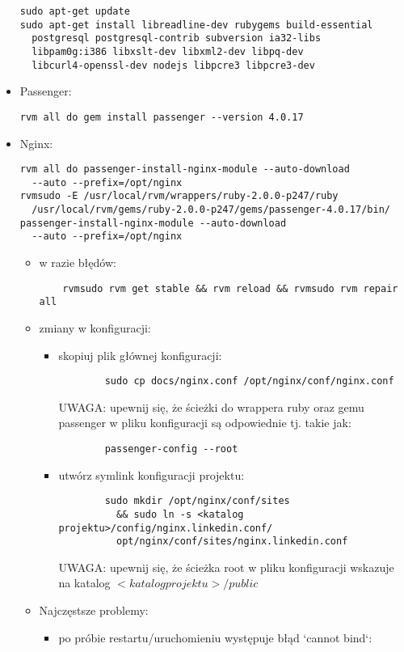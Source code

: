 \begin{itemize}
\begin{verbatim}
sudo apt-get update
sudo apt-get install libreadline-dev rubygems build-essential
  postgresql postgresql-contrib subversion ia32-libs
  libpam0g:i386 libxslt-dev libxml2-dev libpq-dev
  libcurl4-openssl-dev nodejs libpcre3 libpcre3-dev
\end{verbatim}
\item Passenger:
\begin{verbatim}
rvm all do gem install passenger --version 4.0.17
\end{verbatim}
\item Nginx:
\begin{verbatim}
rvm all do passenger-install-nginx-module --auto-download
  --auto --prefix=/opt/nginx
rvmsudo -E /usr/local/rvm/wrappers/ruby-2.0.0-p247/ruby
  /usr/local/rvm/gems/ruby-2.0.0-p247/gems/passenger-4.0.17/bin/
passenger-install-nginx-module --auto-download
  --auto --prefix=/opt/nginx
\end{verbatim}
	\begin{itemize}
	\item w razie błędów:
	\begin{verbatim}
	rvmsudo rvm get stable && rvm reload && rvmsudo rvm repair all
	\end{verbatim}
	\item zmiany w konfiguracji:
		\begin{itemize}
		\item skopiuj plik głównej konfiguracji:
		\begin{verbatim}
		sudo cp docs/nginx.conf /opt/nginx/conf/nginx.conf
		\end{verbatim}
		UWAGA: upewnij się, że ścieżki do wrappera ruby oraz gemu passenger w pliku konfiguracji są odpowiednie tj. takie jak:
		\begin{verbatim}
		passenger-config --root
		\end{verbatim}
				\item utwórz symlink konfiguracji projektu:
		\begin{verbatim}
		sudo mkdir /opt/nginx/conf/sites
		  && sudo ln -s <katalog projektu>/config/nginx.linkedin.conf/
		  opt/nginx/conf/sites/nginx.linkedin.conf
		\end{verbatim}
		UWAGA: upewnij się, że ścieżka root w pliku konfiguracji wskazuje na katalog $<katalog projektu>/public$
		\end{itemize}
	\item Najczęstsze problemy:
		\begin{itemize}
		\item po próbie restartu/uruchomieniu występuje błąd `cannot bind`:

\end{itemize}
\end{itemize}
\end{itemize}
